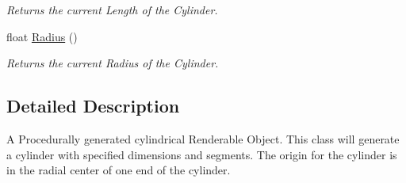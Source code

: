\begin{DoxyCompactItemize}
\begin{DoxyCompactList}\small\item\em Returns the current Length of the Cylinder. \end{DoxyCompactList}\item 
\hypertarget{classc_beam_mesh_a6068db701b4835449bd40a437e3ee908}{
float \hyperlink{classc_beam_mesh_a6068db701b4835449bd40a437e3ee908}{Radius} ()}
\label{classc_beam_mesh_a6068db701b4835449bd40a437e3ee908}

\begin{DoxyCompactList}\small\item\em Returns the current Radius of the Cylinder. \end{DoxyCompactList}\end{DoxyCompactItemize}


\subsection{Detailed Description}
A Procedurally generated cylindrical Renderable Object. This class will generate a cylinder with specified dimensions and segments. The origin for the cylinder is in the radial center of one end of the cylinder. 